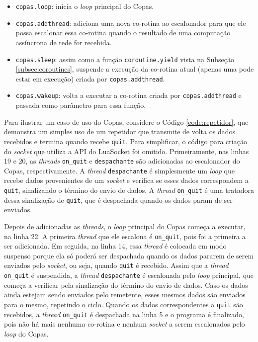 \begin{itemize}
    \item \verb|copas.loop|: inicia o {\em loop} principal do Copas.
    \item \verb|copas.addthread|: adiciona uma nova co-rotina ao escalonador para que ele possa escalonar essa co-rotina quando o resultado de uma computação assíncrona de rede for recebida.
    \item \verb|copas.sleep|: assim como a função \verb|coroutine.yield| vista na Subseção \ref{subsec:coroutines}, suspende a execução da co-rotina atual (apenas uma pode estar em execução) criada por \verb|copas.addthread|.
    \item \verb|copas.wakeup|: volta a executar a co-rotina criada por \verb|copas.addthread| e passada como parâmetro para essa função.
\end{itemize}

Para ilustrar um caso de uso do Copas, considere o Código \ref{code:repetidor}, que demonstra um simples uso de um repetidor que transmite de volta os dados recebidos e termina quando recebe \verb|quit|. Para simplificar, o código para criação do {\em socket} que utiliza a API do LuaSocket foi omitido. Primeiramente, nas linhas 19 e 20, as {\em threads} \verb|on_quit| e \verb|despachante| são adicionadas ao escalonador do Copas, respectivamente. A {\em thread} \verb|despachante| é simplesmente um {\em loop} que recebe dados provenientes de um {\em socket} e verifica se esses dados correspondem a \verb|quit|, sinalizando o término do envio de dados. A {\em thread} \verb|on_quit| é uma tratadora dessa sinalização de \verb|quit|, que é despachada quando os dados param de ser enviados.

Depois de adicionadas as {\em threads}, o {\em loop} principal do Copas começa a executar, na linha 22. A primeira {\em thread} que ele escalona é \verb|on_quit|, pois foi a primeira a ser adicionada. Em seguida, na linha 14, essa {\em thread} é colocada em modo suspenso porque ela só poderá ser despachada quando os dados pararem de serem enviados pelo {\em socket}, ou seja, quando \verb|quit| é recebido. Assim que a {\em thread} \verb|on_quit| é suspendida, a {\em thread} \verb|despachante| é escalonada pelo {\em loop} principal, que começa a verificar pela sinalização do término do envio de dados. Caso os dados ainda estejam sendo enviados pelo remetente, esses mesmos dados são enviados para o mesmo, repetindo o ciclo. Quando os dados correspondentes a \verb|quit| são recebidos, a {\em thread} \verb|on_quit| é despachada na linha 5 e o programa é finalizado, pois não há mais nenhuma co-rotina e nenhum {\em socket} a serem escalonados pelo {\em loop} do Copas.

